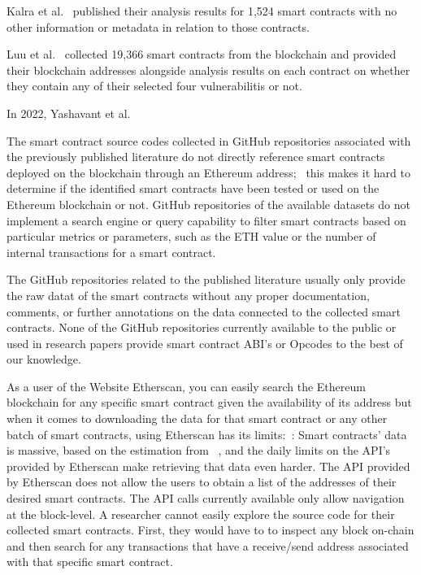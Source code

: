 	Kalra et al.~\cite{kalra2018zeus} published their analysis results for 1,524 smart contracts with no other information or metadata in relation to those contracts.

	Luu et al.~\cite{oyente} collected 19,366 smart contracts from the blockchain and provided their blockchain addresses alongside analysis results on each contract on whether they contain any of their selected four vulnerabilitis or not.

	In 2022, Yashavant et al. ~\cite{yashavant2022scrawld}

	The smart contract source codes collected in GitHub repositories associated with the previously published literature do not directly reference smart contracts deployed on the blockchain through an Ethereum address;~\cite{pierro2020organized}
	this makes it hard to determine if the identified smart contracts have been tested or used on the Ethereum blockchain or not.
	GitHub repositories of the available datasets do not implement a search engine or query capability to filter smart contracts based on particular
	metrics or parameters, such as the ETH value or the number of internal transactions for a smart contract.
	
	The GitHub repositories related to the published literature usually only provide the raw datat of the smart contracts without any proper documentation, comments, or further annotations on the data connected to the collected smart contracts.
	None of the GitHub repositories currently available to the public or used in research papers provide smart contract ABI's or Opcodes to the best of our knowledge.
	
	As a user of the Website Etherscan, you can easily search the Ethereum blockchain for any specific smart contract given the availability of its address but when it comes to downloading the data
	for that smart contract or any other batch of smart contracts,  using Etherscan has its limits:~\cite{pierro2020organized}:
	Smart contracts' data is massive, based on the estimation from ~\cite{pierro2020organized},
	and the daily limits on the API's provided by Etherscan make retrieving that data even harder.
	The API provided by Etherscan does not allow the users to obtain a list of the addresses of their desired smart contracts.
	The  API calls currently available only allow navigation at the block-level.
	A researcher cannot easily explore the source code for their collected smart contracts.
	First, they would have to to inspect any block on-chain and then search for any transactions that have a receive/send address associated with that specific smart contract.

